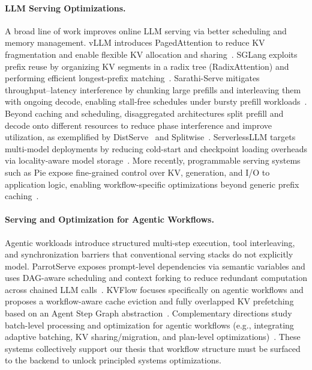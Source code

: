 \paragraph{LLM Serving Optimizations.}
A broad line of work improves online LLM serving via better scheduling and memory management. vLLM introduces PagedAttention to reduce KV fragmentation and enable flexible KV allocation and sharing~\citep{kwon2023efficient}. SGLang exploits prefix reuse by organizing KV segments in a radix tree (RadixAttention) and performing efficient longest-prefix matching~\citep{zheng2024sglang}. Sarathi-Serve mitigates throughput--latency interference by chunking large prefills and interleaving them with ongoing decode, enabling stall-free schedules under bursty prefill workloads~\citep{agrawal2024taming}. Beyond caching and scheduling, disaggregated architectures split prefill and decode onto different resources to reduce phase interference and improve utilization, as exemplified by DistServe~\citep{zhong2024distserve} and Splitwise~\citep{patel2024splitwise}. ServerlessLLM targets multi-model deployments by reducing cold-start and checkpoint loading overheads via locality-aware model storage~\citep{fu2024serverlessllm}. More recently, programmable serving systems such as Pie expose fine-grained control over KV, generation, and I/O to application logic, enabling workflow-specific optimizations beyond generic prefix caching~\citep{gim2025pie}.

\paragraph{Serving and Optimization for Agentic Workflows.}
Agentic workloads introduce structured multi-step execution, tool interleaving, and synchronization barriers that conventional serving stacks do not explicitly model. ParrotServe exposes prompt-level dependencies via semantic variables and uses DAG-aware scheduling and context forking to reduce redundant computation across chained LLM calls~\citep{lin2024parrot}. KVFlow focuses specifically on agentic workflows and proposes a workflow-aware cache eviction and fully overlapped KV prefetching based on an Agent Step Graph abstraction~\citep{pan2025kvflow}. Complementary directions study batch-level processing and optimization for agentic workflows (e.g., integrating adaptive batching, KV sharing/migration, and plan-level optimizations)~\citep{halo2025}. These systems collectively support our thesis that workflow structure must be surfaced to the backend to unlock principled systems optimizations.

